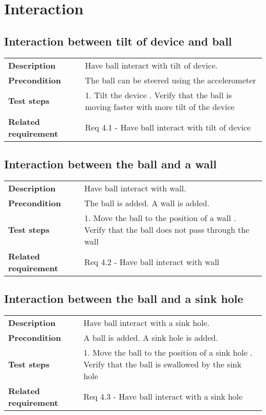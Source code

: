 \documentclass[a4paper,titlepage]{article}
\begin{document}
\newpage
\section{Interaction}
\subsection{Interaction between tilt of device and ball}
\begin{tabularx}{\textwidth}{lX}
	\textbf{Description}	&
		Have ball interact with tilt of device.\\
	\textbf{Precondition}	&
		The ball can be steered using the accelerometer\\
	\textbf{Test steps}	&
		1. Tilt the device \newline
		2. Verify that the ball is moving faster with more tilt of the device\\
	\textbf{Related requirement}	&
		Req 4.1 - Have ball interact with tilt of device \\
\end{tabularx}

\subsection{Interaction between the ball and a wall}
\begin{tabularx}{\textwidth}{lX}
	\textbf{Description}	&
		Have ball interact with wall.\\
	\textbf{Precondition}	&
		The ball is added.\newline
		A wall is added.\\
	\textbf{Test steps}	&
		1. Move the ball to the position of a wall \newline
		2. Verify that the ball does not pass through the wall \\
	\textbf{Related requirement}	&
		Req 4.2 - Have ball interact with wall \\
\end{tabularx}

\subsection{Interaction between the ball and a sink hole}
\begin{tabularx}{\textwidth}{lX}
	\textbf{Description}	&
		Have ball interact with a sink hole.\\
	\textbf{Precondition}	&
		A ball is added.\newline
		A sink hole is added. \\
	\textbf{Test steps}	&
		1. Move the ball to the position of a sink hole \newline
		2. Verify that the ball is swallowed by the sink hole \\
	\textbf{Related requirement}	&
		Req 4.3 - Have ball interact with a sink hole \\
\end{tabularx}
\end{document}

